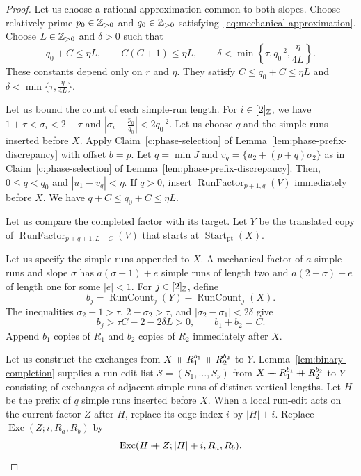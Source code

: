 \begin{proof}
 Let us choose a rational approximation common to both slopes.
Choose relatively prime $p_0\in\mathbb Z_{>0}$ and $q_0\in\mathbb Z_{>0}$ satisfying~\eqref{eq:mechanical-approximation}.
Choose $L\in\mathbb Z_{>0}$ and $\delta>0$ such that
\[
 q_0+C\le\eta L,\qquad C(C+1)\le\eta L,\qquad
 \delta<\min\left\{\tau,q_0^{-2},\frac{\eta}{4L}\right\}.
\]
These constants depend only on $r$ and $\eta$. They satisfy $C\le q_0+C\le\eta L$ and $\delta<\min\{\tau,\frac\eta{4L}\}$.

 Let us bound the count of each simple-run length.
For $i\in[2]_{\mathbb Z}$, we have $1+\tau<\sigma_i<2-\tau$ and $|\sigma_i-\frac{p_0}{q_0}|<2q_0^{-2}$.
Let us choose $q$ and the simple runs inserted before $X$.
Apply Claim~\ref{c:phase-selection} of Lemma~\ref{lem:phase-prefix-discrepancy}
with offset $b=p$. Let $q=\min J$ and $v_q=\{u_2+(p+q)\sigma_2\}$ as in Claim~\ref{c:phase-selection} of Lemma~\ref{lem:phase-prefix-discrepancy}.
Then, $0\le q<q_0$ and $|u_1-v_q|<\eta$.
If $q>0$, insert $\operatorname{RunFactor}_{p+1,q}(V)$ immediately before $X$.
We have $q+C\le q_0+C\le\eta L$.

 Let us compare the completed factor with its target.
Let $Y$ be the translated copy of $\operatorname{RunFactor}_{p+q+1,L+C}(V)$
that starts at $\operatorname{Start}_{\mathrm{pt}}(X)$.

Let us specify the simple runs appended to $X$.
A mechanical factor of $a$ simple runs and slope $\sigma$ has
$a(\sigma-1)+e$ simple runs of length two and $a(2-\sigma)-e$ of length one
for some $|e|<1$.
For $j\in[2]_{\mathbb Z}$, define
\[
 b_j=\operatorname{RunCount}_j(Y)-\operatorname{RunCount}_j(X).
\]
The inequalities $\sigma_2-1>\tau$, $2-\sigma_2>\tau$, and
$|\sigma_2-\sigma_1|<2\delta$ give
\[
 b_j>\tau C-2-2\delta L>0,\qquad b_1+b_2=C.
\]
Append $b_1$ copies of $R_1$ and $b_2$ copies of $R_2$ immediately after $X$.

Let us construct the exchanges from $X\mathbin{+\mkern-10mu+} R_1^{b_1}\mathbin{+\mkern-10mu+} R_2^{b_2}$ to $Y$.
Lemma~\ref{lem:binary-completion} supplies a run-edit list $\mathcal S=(S_1,\ldots,S_\nu)$ from $X\mathbin{+\mkern-10mu+} R_1^{b_1}\mathbin{+\mkern-10mu+} R_2^{b_2}$ to $Y$
consisting of exchanges of adjacent simple runs of distinct vertical lengths.
Let $H$ be the prefix of $q$ simple runs inserted before $X$.
When a local run-edit acts on the current factor $Z$ after $H$, replace its edge index $i$ by $|H|+i$.
Replace $\operatorname{Exc}(Z;i,R_a,R_b)$ by
\[
 \operatorname{Exc}(H\mathbin{+\mkern-10mu+} Z;|H|+i,R_a,R_b).
\]


\end{proof}

